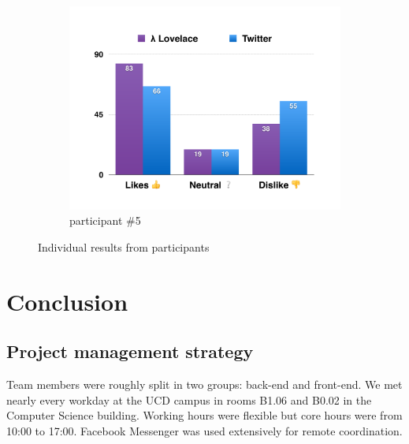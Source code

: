 \documentclass{article}
\begin{document}
\begin{figure}
    \begin{subfigure}[b]{0.48\textwidth}
        \includegraphics[page=5,width=\textwidth]{evaluation_charts}
        \caption{participant \#5}
        \label{fig:participant5}
    \end{subfigure}
    
    \vspace{2em}
    
    \caption{Individual results from participants}
    \label{fig:evaluation-results}
\end{figure}



\newpage


\section{Conclusion} %

\subsection{Project management strategy} %
Team members were roughly split in two groups: back-end and front-end. We met nearly every workday at the UCD campus in rooms B1.06 and B0.02 in the Computer Science building. Working hours were flexible but core hours were from 10:00 to 17:00. Facebook Messenger \cite{messenger} was used extensively for remote coordination.
\end{document}
